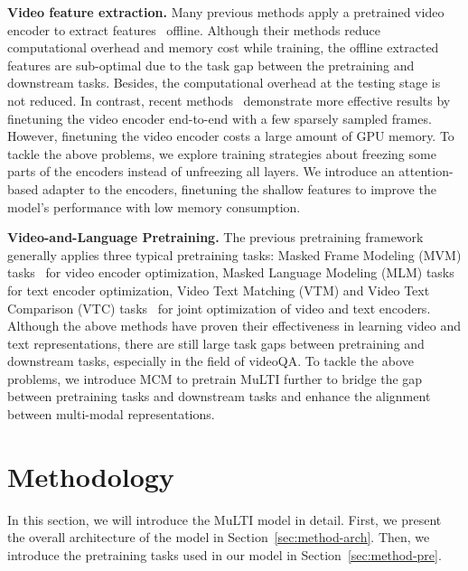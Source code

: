 \documentclass[10pt,twocolumn,letterpaper]{article}
\begin{document}
\textbf{Video feature extraction.} 
Many previous methods apply a pretrained video encoder to extract features~\cite{Miech2019HowTo100MLA,Sun2019VideoBERTAJ,Li2020HeroHE,Zhu2020ActBERTLG,Miech2020EndtoEndLO,Luo2020Univl} offline. Although their methods reduce computational overhead and memory cost while training, the offline extracted features are sub-optimal due to the task gap between the pretraining and downstream tasks. Besides, the computational overhead at the testing stage is not reduced. 
In contrast, recent methods~\cite{Lei2021Less, Fu2021VIOLETE, Li2021AlignAP} demonstrate more effective results by finetuning the video encoder end-to-end with a few sparsely sampled frames. However, finetuning the video encoder costs a large amount of GPU memory. 
To tackle the above problems, we explore training strategies about freezing some parts of the encoders instead of unfreezing all layers. We introduce an attention-based adapter to the encoders, finetuning the shallow features to improve the model's performance with low memory consumption.


\textbf{Video-and-Language Pretraining.} The previous pretraining framework generally applies three typical pretraining tasks: Masked Frame Modeling (MVM) tasks~\cite{Lei2021UnderstandingCV, Ma2021Top1SO, Fu2021VIOLETE,Huang2022CloverTA} for video encoder optimization, Masked Language Modeling (MLM) tasks~\cite{Devlin2018Bert,Sun2019VideoBERTAJ,Zhu2020ActBERTLG,Luo2020Univl,Li2020HeroHE,Lei2021Less,Fu2021VIOLETE} for text encoder optimization, Video Text Matching (VTM) and Video Text Comparison (VTC) tasks~\cite{Li2020HeroHE,Luo2020Univl,Fu2021VIOLETE,Li2021AlignAP} for joint optimization of video and text encoders. 
Although the above methods have proven their effectiveness in learning video and text representations, there are still large task gaps between pretraining and downstream tasks, especially in the field of videoQA.
To tackle the above problems, we introduce MCM to pretrain MuLTI further to bridge the gap between pretraining tasks and downstream tasks and enhance the alignment between multi-modal representations.

 \vspace{-1.5ex}
\section{Methodology}
\vspace{-0.5ex}


In this section, we will introduce the MuLTI model in detail. First, we present the overall architecture of the model in Section~\ref{sec:method-arch}.
Then, we introduce the pretraining tasks used in our model in Section~\ref{sec:method-pre}.
\end{document}
